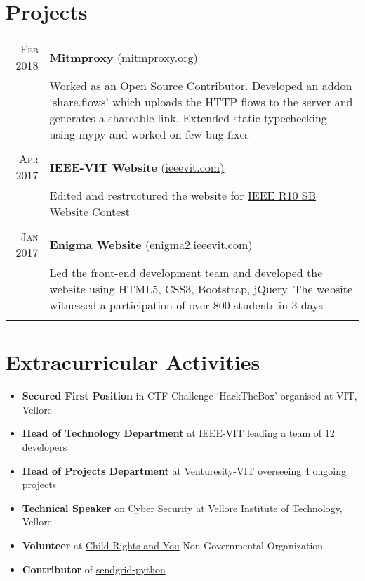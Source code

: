 \documentclass[a4paper,1pt]{article}
\begin{document}
\section{Projects}
\begin{tabular}{r|p{11cm}}

\textsc{Feb 2018} & \textbf{Mitmproxy} 
\href{https://mitmproxy.org/}{(mitmproxy.org)}\\&\footnotesize{Worked as an Open Source Contributor. Developed an addon ‘share.flows’ which uploads the HTTP flows to the server and generates a shareable link. Extended static typechecking using mypy and worked on few bug fixes}\\\multicolumn{2}{c}{}\\

\textsc{Apr 2017} & \textbf{IEEE-VIT Website} \href{https://ieeevit.com}{(ieeevit.com)}\\&\footnotesize{Edited and restructured the website for \href{http://sac.ieeer10.org/website-contest/}{IEEE R10 SB Website Contest}}\\\multicolumn{2}{c}{} \\
 \textsc{Jan 2017} & \textbf{Enigma Website} \href{http://enigma2.ieeevit.com/}{(enigma2.ieeevit.com)}\\&\footnotesize{Led the front-end development team and developed the website using HTML5, CSS3, Bootstrap, jQuery. The website witnessed a participation of over 800 students in 3 days}\\\multicolumn{2}{c}{} 

\end{tabular}

\section{Extracurricular Activities}{\raggedbottom}
\begin{itemize}
\item \textbf{Secured First Position} in CTF Challenge ‘HackTheBox' organised at VIT, Vellore
\item \textbf{Head of Technology Department} at IEEE-VIT leading a team of 12 developers
\item \textbf{Head of Projects Department} at Venturesity-VIT overseeing 4 ongoing projects
\item \textbf{Technical Speaker} on Cyber Security at Vellore Institute of Technology, Vellore
\item \textbf{Volunteer} at \href{https://www.cry.org/}{Child Rights and You} Non-Governmental Organization
\item \textbf{Contributor} of \href{https://github.com/sendgrid/sendgrid-python}{sendgrid-python}

\end{itemize}
\end{document}
